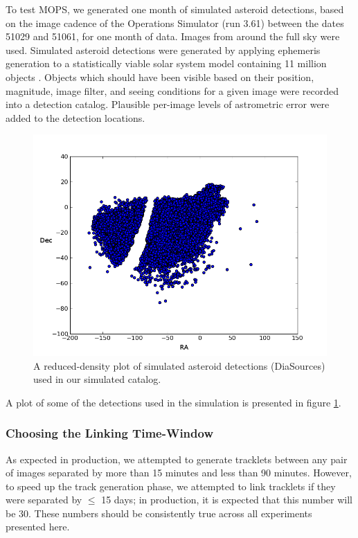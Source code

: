 To test MOPS, we generated one month of simulated asteroid detections,
based on the image cadence of the Operations Simulator (run 3.61)
between the dates 51029 and 51061, for one month of data.  Images from
around the full sky were used.  Simulated asteroid detections were
generated by applying ephemeris generation to a statistically viable
solar system model containing 11 million objects \citep{Grav2011}.
Objects which should have been visible based on their position,
magnitude, image filter, and seeing conditions for a given image were
recorded into a detection catalog.  Plausible per-image levels of
astrometric error were added to the detection locations.

\begin{figure}[ht!]
\centering
\includegraphics[scale=.7]{newIllustrations/fullSkyYear5_sourcesScatter.png}
\caption{A reduced-density plot of simulated asteroid detections
  (DiaSources) used in our simulated catalog.}
\label{diasPlot}
\end{figure}

A plot of some of the detections used in the simulation is presented
in figure \ref{diasPlot}.  









\subsubsection{Choosing the Linking Time-Window}

As expected in production, we attempted to generate tracklets between
any pair of images separated by more than 15 minutes and less than
90 minutes.  However, to speed up the track generation phase, we
attempted to link tracklets if they were separated by $\leq$ 15 days;
in production, it is expected that this number will be 30.  These
numbers should be consistently true across all experiments presented
here.


